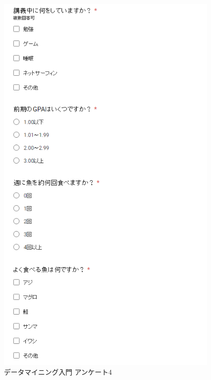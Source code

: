 \begin{figure}[p]
\centering
\includegraphics[width=11cm]{forms4.PNG}
\caption{データマイニング入門 アンケート4}\label{サンプル図}
\end{figure}

